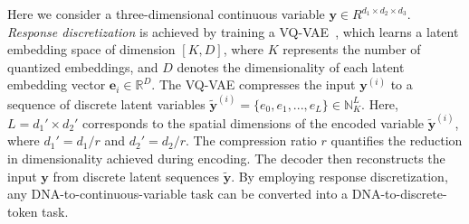 Here we consider a three-dimensional continuous variable $\mathbf{y} \in R^{d_1\times d_2\times d_3}$. \textit{Response discretization} is achieved by training a VQ-VAE~\cite{van2017neural}, which learns a latent embedding space of dimension $[K, D]$, where $K$ represents the number of quantized embeddings, and $D$ denotes the dimensionality of each latent embedding vector $\mathbf{e}_i \in \mathbb{R}^D$. The VQ-VAE compresses the input $\mathbf{y}^{(i)}$ to a sequence of discrete latent variables $\mathbf{\tilde{y}}^{(i)}=\{e_0,e_1,...,e_L\} \in \mathbb{N}^{L}_K$. Here, $L = d_1' \times d_2'$ corresponds to the spatial dimensions of the encoded variable $\mathbf{\tilde{y}}^{(i)}$, where $d_1'=d_1/r$ and $d_2'=d_2/r$. The compression ratio $r$ quantifies the reduction in dimensionality achieved during encoding. The decoder then reconstructs the input $\mathbf{y}$ from discrete latent sequences $\mathbf{\tilde{y}}$.  By employing response discretization, any DNA-to-continuous-variable task can be converted into a DNA-to-discrete-token task. %
